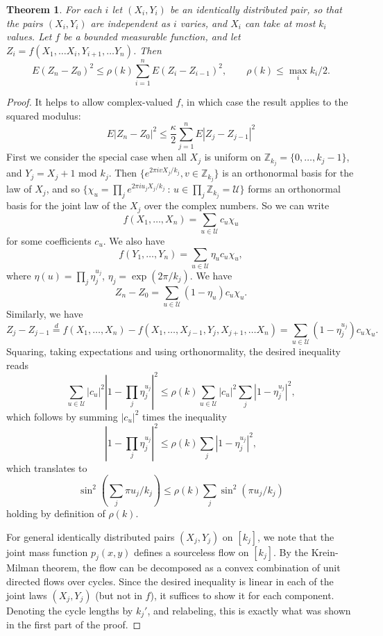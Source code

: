 \documentclass[letterpaper, 12pt]{article}
\theoremstyle{plain}
\newtheorem{theorem}{Theorem}
\theoremstyle{definition}
\theoremstyle{remark}
\begin{document}
\begin{theorem}\label{thm: finite support}
For each \(i\) let \((X_i,Y_i)\) be an identically distributed pair, so that the pairs \((X_i,Y_i)\) are independent as \(i\) varies, and \(X_i\) can take at most \(k_i\) values. Let \(f\) be a bounded measurable function, and let \(Z_i=f(X_1,\ldots X_{i},Y_{i+1},\ldots Y_n)\). Then
$$
E(Z_n-Z_0)^2\le \rho(k) \sum_{i=1}^n E(Z_i-Z_{i-1})^2, \qquad \rho (k)\le \max_i k_i/2.
$$
\end{theorem}
\begin{proof}
It helps to allow complex-valued \(f\), in which case the result applies to the squared modulus:
$$
E|Z_n-Z_0|^2\le \frac{\kappa}{2}\sum_{j=1}^n E|Z_j-Z_{j-1}|^2
$$
First we consider the special case when all \(X_j\) is uniform on \(\mathbb Z_{k_j}=\{0,\ldots,k_j-1\}\), and \(Y_j=X_{j}+1\) mod \(k_j\). Then \(\{e^{2\pi i v X_j/k_j}, v\in \mathbb Z_{k_j}\}\) is an orthonormal basis for the law of \(X_j\), and so
\(\{\chi_u=\prod_j e^{2\pi iu_j X_j/k_j}\ :\,u\in \prod_j \mathbb Z_{k_j}=\mathcal U\}\) forms an orthonormal basis for the joint law of the \(X_j\) over the complex numbers. So we can write
$$f(X_1,\ldots, X_n)=\sum_{u\in \mathcal U}c_u\chi_u$$ for some coefficients \(c_u\). We also have
$$f(Y_1,\ldots, Y_n)=\sum_{u\in \mathcal U}\eta_uc_u\chi_u,$$
where \(\eta(u)=\prod_j \eta_j^{u_j}\), \(\eta_j=\exp(2\pi/k_j)\). We have
$$
Z_n-Z_0=\sum_{u\in \mathcal U} (1-\eta_u)c_u\chi_u.
$$
Similarly, we have
$$
Z_{j}-Z_{j-1}\stackrel{d}{=}f(X_1,\ldots,X_n)-f(X_1,\ldots,X_{j-1}, Y_{j},X_{j+1},\ldots X_n)=\sum_{u\in \mathcal U}(1-\eta_j^{u_j})c_u\chi_u.
$$
Squaring, taking expectations and using orthonormality, the desired inequality reads
$$
\sum _{u\in \mathcal U}|c_u|^2|1-\prod_j\eta_j^{u_j}|^2\le \rho(k)\sum _{u\in \mathcal U}|c_u|^2\sum_j|1-\eta_j^{u_j}|^2,
$$
which follows by summing \(|c_u|^2\) times the inequality
$$
|1-\prod_j\eta_j^{u_j}|^2\le \rho(k)\sum_j|1-\eta_j^{u_j}|^2,
$$
which translates to
$$
\sin^2(\sum_{j} \pi u_j/k_j)\le \rho(k)\sum_{j}\sin^2(\pi u_j/k_j)
$$
holding by definition of \(\rho(k)\).

For general identically distributed pairs \((X_j,Y_j)\) on \([k_j]\), we note that the joint mass function \(p_j(x,y)\) defines a sourceless flow on \([k_j]\). By the Krein-Milman theorem, the flow can be decomposed as a convex combination of unit directed flows over cycles. Since the desired inequality is linear in each of the joint laws \((X_j,Y_j)\) (but not in \(f\)), it suffices to show it for each component. Denoting the cycle lengths by \(k_j'\), and relabeling, this is exactly what was shown in the first part of the proof.
\end{proof}
\end{document}
